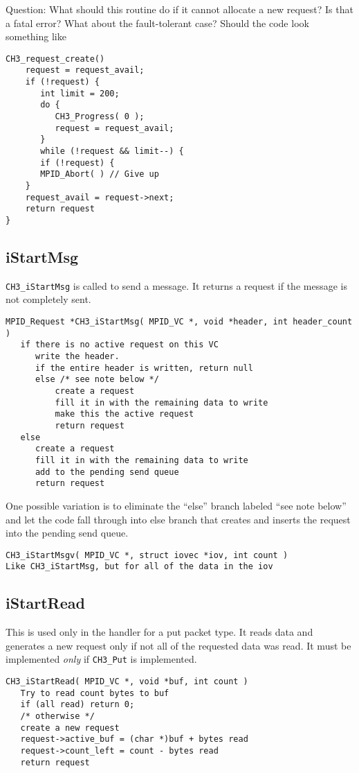 \documentclass{article}
\def\code{\begingroup\makeustext\eatcode}
\def\eatcode#1{\texttt{#1}\endgroup}
\begin{document}
Question: What should this routine do if it cannot allocate a new
request?  Is that a fatal error?  What about the fault-tolerant case?
Should the code look something like
\begin{verbatim}
CH3_request_create()
    request = request_avail;
    if (!request) {
       int limit = 200;
       do { 
          CH3_Progress( 0 );
          request = request_avail;
       }
       while (!request && limit--) {
       if (!request) { 
	   MPID_Abort( ) // Give up
    }
    request_avail = request->next;
    return request
}    
\end{verbatim}

\subsection{iStartMsg}
\code{CH3_iStartMsg} is called to send a message.  It returns a
request if the message is 
not completely sent.

\begin{verbatim}
MPID_Request *CH3_iStartMsg( MPID_VC *, void *header, int header_count )
   if there is no active request on this VC
      write the header.
      if the entire header is written, return null
      else /* see note below */
          create a request
          fill it in with the remaining data to write
          make this the active request
          return request               
   else
      create a request
      fill it in with the remaining data to write
      add to the pending send queue
      return request
\end{verbatim}
One possible variation is to eliminate the ``else'' branch labeled ``see note
below'' and let the code fall through into else branch that creates and
inserts the request into the pending send queue.

\begin{verbatim}
CH3_iStartMsgv( MPID_VC *, struct iovec *iov, int count )
Like CH3_iStartMsg, but for all of the data in the iov
\end{verbatim}

\subsection{iStartRead}
This is used only in the handler for a put packet type.  It reads data and
generates a new request only if not all of the requested data was
read.
It must be implemented \emph{only} if \code{CH3_Put} is implemented.

\begin{verbatim}
CH3_iStartRead( MPID_VC *, void *buf, int count )
   Try to read count bytes to buf
   if (all read) return 0;
   /* otherwise */
   create a new request
   request->active_buf = (char *)buf + bytes read
   request->count_left = count - bytes read
   return request
\end{verbatim}
\end{document}
